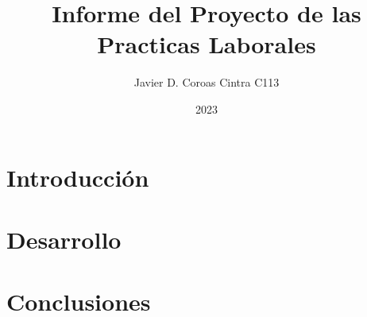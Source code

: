 \documentclass{article}
\title{Informe del Proyecto de las Practicas Laborales}
\author{Javier D. Coroas Cintra C113}
\date{2023}
\begin{document}
\maketitle

\section{Introducción} 
%

\section{Desarrollo}
%

\section{Conclusiones}
%
\end{document}
